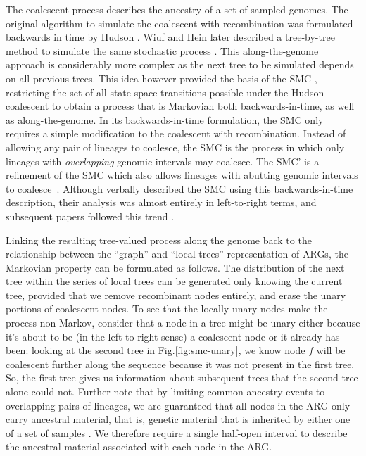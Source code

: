 \documentclass{article}
\begin{document}
% 
The coalescent process describes the ancestry of a set of sampled genomes.
The original algorithm 
to simulate the coalescent with
recombination was formulated backwards in time
by Hudson \citeyearpar{hudson_properties_1983}. 
Wiuf and Hein later described
a tree-by-tree method to simulate the same stochastic process 
\citep{wiuf_recombination_1999}.
This along-the-genome approach is considerably more complex as the next 
tree to be simulated depends on all previous trees.
This idea however provided the basis of the 
SMC \citep{mcvean_approximating_2005}, restricting the set of all state
space transitions possible under the Hudson coalescent to
obtain a process that is Markovian both backwards-in-time, 
as well as along-the-genome.
In its backwards-in-time formulation, the SMC only requires a
simple modification to the coalescent with recombination.
Instead of allowing any pair of lineages to coalesce,
the SMC is the process in which only lineages with \emph{overlapping} 
genomic intervals may coalesce. The SMC' is a refinement 
of the SMC which also allows lineages with abutting genomic intervals to 
coalesce~\citep{marjoram_fast_2006}.
Although \citet{mcvean_approximating_2005} verbally described the SMC
using this backwards-in-time description, their analysis
was almost entirely in left-to-right terms,
and subsequent papers followed this trend
\citep{li_inference_2011,paul_accurate_2011,schiffels_inferring_2014,
rasmussen_genome-wide_2014}.

Linking the resulting tree-valued process along the genome back to
the relationship between the ``graph'' and
``local trees'' representation of ARGs, 
the Markovian property can be formulated as follows.
The distribution of the next tree within the series
of local trees can be generated only knowing the current tree,
provided that we remove recombinant nodes entirely,
and erase the unary portions of coalescent nodes.
To see that the locally unary nodes make the process non-Markov,
consider that a node in a tree might be unary either because
it's about to be (in the left-to-right sense) a coalescent node 
or it already has been:
looking at the second tree in Fig.\ref{fig:smc-unary},
we know node $f$ will be coalescent further along the sequence
because it was not present in the first tree.
So, the first tree gives us information about subsequent trees
that the second tree alone could not.
Further note that by limiting common ancestry events to overlapping 
pairs of lineages, we are guaranteed that all nodes in the ARG 
only carry ancestral material, that is,
genetic material that is inherited by either one of a set of samples
\citep{wiuf_ancestry_1999}.
We therefore require a single half-open interval to describe
the ancestral
material associated with each node in the ARG.
\end{document}
